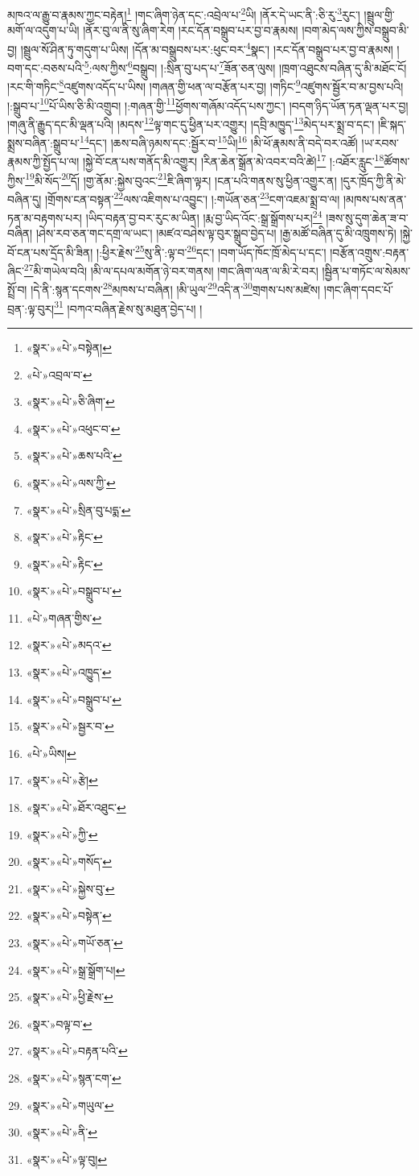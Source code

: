 མཁའ་ལ་རྒྱུ་བ་རྣམས་ཀྱང་བརྟེན།\footnote{«སྣར་»«པེ་»བསྟེན།} །གང་ཞིག་ཉེན་དང་:འབྲེལ་པ་\footnote{«པེ་»འབྲལ་བ་}ཡི། །ནོར་དེ་ཡང་ནི་:ཅི་རུ་\footnote{«སྣར་»«པེ་»ཅི་ཞིག་}རུང་། །སྦྲུལ་གྱི་མགོ་ལ་འདུག་པ་ཡི། །ནོར་བུ་ལ་ནི་སུ་ཞིག་རེག །རང་དོན་བསྒྲུབ་པར་བྱ་བ་རྣམས། །བག་མེད་ལས་ཀྱིས་བསྒྲུབ་མི་བྱ། །སྦྲུལ་སོ་ཤིན་ཏུ་གདུག་པ་ཡིས། །དོན་མ་བསྒྲུབས་པར་:ཕུང་བར་\footnote{«སྣར་»«པེ་»འཕུང་བ་}སྣང་། །རང་དོན་བསྒྲུབ་པར་བྱ་བ་རྣམས། །བག་དང་:བཅས་པའི་\footnote{«སྣར་»«པེ་»ཆས་པའི་}:ལས་ཀྱིས་\footnote{«སྣར་»«པེ་»ལས་ཀྱི་}བསྒྲུབ། །:སྲིན་བུ་པད་པ་\footnote{«སྣར་»«པེ་»སྲིན་བུ་པདྨ་}ཟོན་ཅན་ལུས། །ཁྲག་འཐུངས་བཞིན་དུ་མི་མཐོང་ངོ། །རང་གི་གཏིང་\footnote{«སྣར་»«པེ་»རྟིང་}འཛུགས་འདོད་པ་ཡིས། །གཞན་གྱི་ཕན་ལ་བརྩོན་པར་བྱ། །གཏིང་\footnote{«སྣར་»«པེ་»རྟིང་}འཛུགས་སྦྱོར་བ་མ་བྱས་པའི། །:སྒྲུབ་པ་\footnote{«སྣར་»«པེ་»བསྒྲུབ་པ་}པོ་ཡིས་ཅི་མི་འགྲུབ། །:གཞན་གྱི་\footnote{«པེ་»གཞན་གྱིས་}ཕྱོགས་གཞོམ་འདོད་པས་ཀྱང་། །བདག་ཉིད་ཡོན་ཏན་ལྡན་པར་བྱ། །གཞུ་ནི་རྒྱུད་དང་མི་ལྡན་པའི། །མདས་\footnote{«སྣར་»«པེ་»མདའ་}ལྟ་གང་དུ་ཕྱིན་པར་འགྱུར། །དབྲི་མཁྱུད་\footnote{«སྣར་»«པེ་»འཁྱུད་}མེད་པར་སྨྲ་བ་དང་། །ཇི་སྐད་སྨྲས་བཞིན་:སྒྲུབ་པ་\footnote{«སྣར་»«པེ་»བསྒྲུབ་པ་}དང་། །ཆས་བཞི་ཉམས་དང་:སྦྱོར་བ་\footnote{«སྣར་»«པེ་»སྦྱར་བ་}ཡི།\footnote{«པེ་»ཡིས།} །མི་ཕོ་རྣམས་ནི་བདེ་བར་འཚོ། །ཡ་རབས་རྣམས་ཀྱི་སྤྱོད་པ་ལ། །སྐྱེ་བོ་ངན་པས་གནོད་མི་འགྱུར། །རིན་ཆེན་སྒྲོན་མེ་འབར་བའི་ཚེ།\footnote{«སྣར་»«པེ་»རྩེ།} །:འཐོར་རླུང་\footnote{«སྣར་»«པེ་»ཐོར་འཐུང་}ཚོགས་ཀྱིས་\footnote{«སྣར་»«པེ་»ཀྱི་}མི་སོད་\footnote{«སྣར་»«པེ་»གསོད་}དོ། །གྱ་ནོམ་:སྐྱེས་བུའང་\footnote{«སྣར་»«པེ་»སྐྱེས་བུ་}ཇི་ཞིག་ལྟར། །ངན་པའི་གནས་སུ་ཕྱིན་འགྱུར་ན། །དུར་ཁྲོད་ཀྱི་ནི་མེ་བཞིན་དུ། །གྲོགས་ངན་བསྟན་\footnote{«སྣར་»«པེ་»བསྟེན་}ལས་འཇིགས་པ་འབྱུང་། །:གཡོན་ཅན་\footnote{«སྣར་»«པེ་»གཡོ་ཅན་}ངག་འཇམ་སྨྲ་བ་ལ། །མཁས་པས་ནན་ཏན་མ་བརྟགས་པར། །ཡིད་བརྟན་བྱ་བར་རུང་མ་ཡིན། །རྨ་བྱ་ཡིད་འོང་:སྒྲ་སྒྲོགས་པར།\footnote{«སྣར་»«པེ་»སྒྲ་སྒྲོག་པ།} །ཟས་སུ་དུག་ཆེན་ཟ་བ་བཞིན། །ཤེས་རབ་ཅན་གང་དགྲ་ལ་ཡང་། །མཛའ་བཤེས་ལྟ་བུར་སྒྲུབ་བྱེད་པ། །རྒྱ་མཚོ་བཞིན་དུ་མི་འཁྲུགས་ཏེ། །སྐྱེ་བོ་ངན་པས་དྲོད་མི་ཟིན། །:ཕྱིར་རྗེས་\footnote{«སྣར་»«པེ་»ཕྱི་རྗེས་}སུ་ནི་:ལྟ་བ་\footnote{«སྣར་»བལྟ་བ་}དང་། །བག་ཡོད་ཁོང་ཁྲོ་མེད་པ་དང་། །བརྩོན་འགྲུས་:བརྟན་ཞིང་\footnote{«སྣར་»«པེ་»བརྟན་པའི་}མི་གཡེལ་བའི། །མི་ལ་དཔལ་མགོན་ཉེ་བར་གནས། །གང་ཞིག་ལན་ལ་མི་རེ་བར། །སྦྱིན་པ་གཏོང་ལ་སེམས་སྤྲོ་བ། །དེ་ནི་:སྙན་དངགས་\footnote{«སྣར་»«པེ་»སྙན་ངག་}མཁས་པ་བཞིན། །མི་ཡུལ་\footnote{«སྣར་»«པེ་»གཡུལ་}འདི་ན་\footnote{«སྣར་»«པེ་»ནི་}གྲགས་པས་མཛེས། །གང་ཞིག་དབང་པོ་བྲན་:ལྟ་བུར།\footnote{«སྣར་»«པེ་»ལྟ་བུ།} །བཀའ་བཞིན་རྗེས་སུ་མཐུན་བྱེད་པ། །
